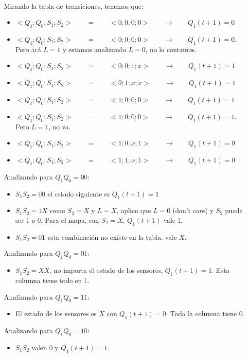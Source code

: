 \\[5pt]
Mirando la tabla de transiciones, tenemos que:
\begin{itemize}[nosep]
	\item $<Q_1;Q_0;S_1;S_2>\qquad{} =\qquad{} <0;0;0;0> \qquad{}\rightarrow \qquad{} Q_1(t+1) = 0$ 
	\item $<Q_1;Q_0;S_1;S_2>\qquad{} =\qquad{} <0;0;0;0> \qquad{}\rightarrow \qquad{} Q_1(t+1) = 0$. Pero acá $L=1$ y estamos analizando $L=0$, no lo contamos.
	\item $<Q_1;Q_0;S_1;S_2>\qquad{} =\qquad{} <0;0;1;x> \qquad{}\rightarrow \qquad{} Q_1(t+1) = 1$ 
	\item $<Q_1;Q_0;S_1;S_2>\qquad{} =\qquad{} <0;1;x;x> \qquad{}\rightarrow \qquad{} Q_1(t+1) = 1$ 
	\item $<Q_1;Q_0;S_1;S_2>\qquad{} =\qquad{} <1;0;0;0> \qquad{}\rightarrow \qquad{} Q_1(t+1) = 1$ 
	\item $<Q_1;Q_0;S_1;S_2>\qquad{} =\qquad{} <1;0;0;0> \qquad{}\rightarrow \qquad{} Q_1(t+1) = 1$. Pero $L=1$, no va.
	\item $<Q_1;Q_0;S_1;S_2>\qquad{} =\qquad{} <1;0;x;1> \qquad{}\rightarrow \qquad{} Q_1(t+1) = 0$ 
	\item $<Q_1;Q_0;S_1;S_2>\qquad{} =\qquad{} <1;1;x;1> \qquad{}\rightarrow \qquad{} Q_1(t+1) = 0$ 
\end{itemize}
Analizando para $Q_1Q_0 = 00$:
\begin{itemize}[nosep]
	\item $S_1S_2 = 00$ el estado siguiente es $Q_1(t+1) = 1$
	\item $S_1S_2 = 1X$ como $S_2 = X$ y $L=X$, aplico que $L=0$ (don't care) y $S_2$ puede ser 1 o 0. Para el mapa, con $S_2 = X$, $Q_1(t+1)$ vale 1. 
	\item $S_1S_2 = 01$ esta combinación no existe en la tabla, vale $X$.
\end{itemize}
Analizando para $Q_1Q_0 = 01$:
\begin{itemize}[nosep]
	\item $S_1S_2= XX$, no importa el estado de los sensores, $Q_1(t+1) = 1$. Esta columna tiene todo en 1.
\end{itemize}
Analizando para $Q_1Q_0 = 11$:
\begin{itemize}[nosep]
	\item El estado de los sensores es $X$ con $Q_1(t+1) = 0$. Toda la columna tiene 0.
\end{itemize}
Analizando para $Q_1Q_0 = 10$:
\begin{itemize}[nosep]
	\item $S_1S_2$ valen 0 y $Q_1(t+1) = 1$.
\end{itemize}
